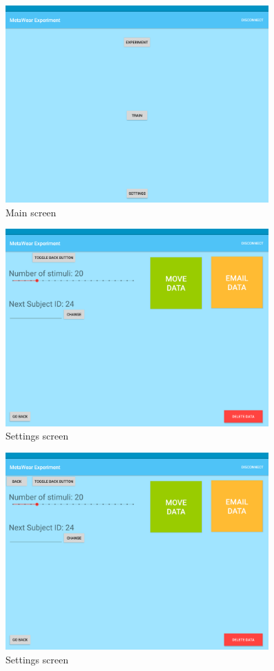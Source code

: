 \begin{figure}[h!]
\centering
\includegraphics[width=0.9\textwidth]{figures/tablet_screen0.png}
\caption{Main screen}
\label{appendix_app_screen_0}
\end{figure}

\begin{figure}[h!]
\centering
\includegraphics[width=0.9\textwidth]{figures/tablet_screen1.png}
\caption{Settings screen}
\label{appendix_app_screen_1}
\end{figure}

\begin{figure}[h!]
\centering
\includegraphics[width=0.9\textwidth]{figures/tablet_screen2.png}
\caption{Settings screen}
\label{appendix_app_screen_2}
\end{figure}

